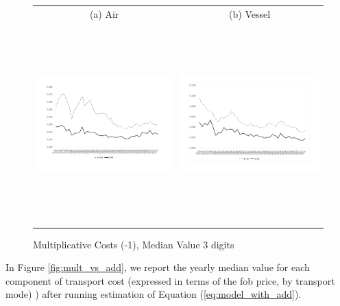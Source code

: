 \documentclass[a4paper,11pt]{article}
\begin{document}
\begin{figure}[htbp]
\caption{Multiplicative Costs (-1), Median Value 3 digits}\label{fig:good_fit}
\begin{center}
\begin{tabular}{cc}
{\small (a) Air } & {\small (b) Vessel}\\
\includegraphics[width=3.5in, height=3in]{graph1a.pdf}
& \includegraphics[width=3.5in,height=3in]{graph1b.pdf} \\
\end{tabular}
\end{center}
\end{figure}

In Figure \ref{fig:mult_vs_add}, we report the yearly median value for each component of transport cost (expressed in terms of the fob price, by transport mode) ) after running estimation of Equation (\ref{eq:model_with_add}). 
\end{document}

